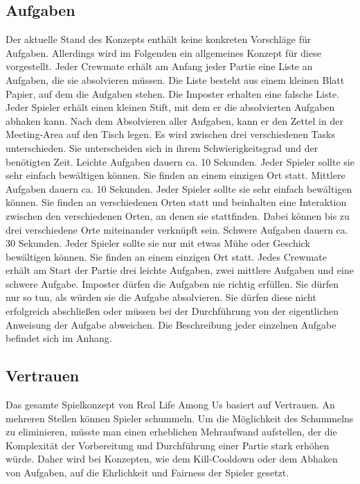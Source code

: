 \subsection{Aufgaben}
Der aktuelle Stand des Konzepts enthält keine konkreten Vorschläge für Aufgaben.
Allerdings wird im Folgenden ein allgemeines Konzept für diese vorgestellt.
\newline
Jeder Crewmate erhält am Anfang jeder Partie eine Liste an Aufgaben, die sie
absolvieren müssen. Die Liste besteht aus einem kleinen Blatt Papier, auf dem
die Aufgaben stehen.  Die Imposter erhalten eine falsche Liste.
Jeder Spieler erhält einen kleinen Stift, mit dem er die absolvierten Aufgaben
abhaken kann. Nach dem Absolvieren aller Aufgaben, kann er den Zettel in der
Meeting-Area auf den Tisch legen.
\newline
Es wird zwischen drei verschiedenen Tasks
unterschieden. Sie unterscheiden sich in ihrem Schwierigkeitsgrad und der
benötigten Zeit.
\newline
Leichte Aufgaben dauern ca. 10 Sekunden. Jeder Spieler sollte sie sehr einfach
bewältigen können. Sie finden an einem einzigen Ort statt.
\newline
Mittlere Aufgaben dauern ca. 10 Sekunden. Jeder Spieler sollte sie sehr einfach
bewältigen können. Sie finden an verschiedenen Orten statt und beinhalten
eine Interaktion zwischen den verschiedenen Orten, an denen sie stattfinden.
Dabei können bis zu drei verschiedene Orte miteinander verknüpft sein.
\newline
Schwere Aufgaben dauern ca. 30 Sekunden. Jeder Spieler sollte sie nur mit etwas
Mühe oder Geschick bewältigen können. Sie finden an einem einzigen Ort statt.
\newline
Jedes Crewmate erhält am Start der Partie drei leichte Aufgaben, zwei mittlere
Aufgaben und eine schwere Aufgabe.
\newline
Imposter dürfen die Aufgaben nie richtig erfüllen. Sie dürfen nur so tun, als
würden sie die Aufgabe absolvieren. Sie dürfen diese nicht erfolgreich
abschließen oder müssen bei der Durchführung von der eigentlichen Anweisung der
Aufgabe abweichen.
\newline
Die Beschreibung jeder einzelnen Aufgabe befindet sich im Anhang.


\subsection{Vertrauen}
Das gesamte Spielkonzept von Real Life Among Us basiert auf Vertrauen. An
mehreren Stellen können Spieler schummeln. Um die Möglichkeit des Schummelns zu
eliminieren, müsste man einen erheblichen Mehraufwand aufstellen, der die
Komplexität der Vorbereitung und Durchführung einer Partie stark erhöhen würde.
Daher wird bei Konzepten, wie dem Kill-Cooldown oder dem Abhaken von Aufgaben,
auf die Ehrlichkeit und Fairness der Spieler gesetzt.
